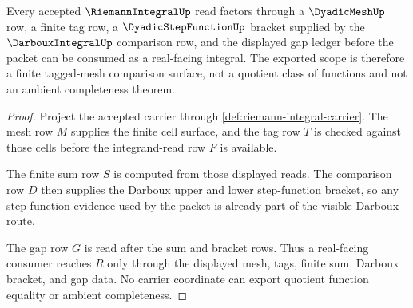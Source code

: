 \begin{theorem}
\label{thm:riemann-integral-darboux-step-scope}
Every accepted $\RiemannIntegralUp$ read factors through a $\DyadicMeshUp$ row, a finite tag row, a $\DyadicStepFunctionUp$ bracket supplied by the $\DarbouxIntegralUp$ comparison row, and the displayed gap ledger before the packet can be consumed as a real-facing integral. The exported scope is therefore a finite tagged-mesh comparison surface, not a quotient class of functions and not an ambient completeness theorem.
\end{theorem}
\begin{proof}
Project the accepted carrier through \autoref{def:riemann-integral-carrier}. The mesh row $M$ supplies the finite cell surface, and the tag row $T$ is checked against those cells before the integrand-read row $F$ is available.

The finite sum row $S$ is computed from those displayed reads. The comparison row $D$ then supplies the Darboux upper and lower step-function bracket, so any step-function evidence used by the packet is already part of the visible Darboux route.

The gap row $G$ is read after the sum and bracket rows. Thus a real-facing consumer reaches $R$ only through the displayed mesh, tags, finite sum, Darboux bracket, and gap data. No carrier coordinate can export quotient function equality or ambient completeness.
\end{proof}

